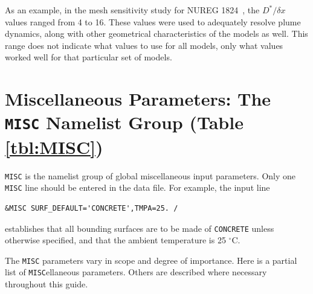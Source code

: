 \documentclass[11pt]{book}
\newcommand{\ct}{\tt\small}
\newcommand{\dx}{\delta x}
\begin{document}
As an example, in the mesh sensitivity study for NUREG 1824~\cite{NUREG_1824}, the $D^*/\dx$ values ranged from 4 to 16.
These values were used to adequately resolve plume dynamics,
along with other geometrical characteristics of the models as well.
This range does not indicate what values to use for all models,
only what values worked well for that particular set of models.


\clearpage
\section{Miscellaneous Parameters: The \texorpdfstring{{\tt MISC}}{MISC} Namelist Group (Table \ref{tbl:MISC})}
\label{info:MISC}

{\ct MISC} is the namelist group of global miscellaneous input parameters.
Only one {\ct MISC} line should be entered in the data file. For example, the input line

\footnotesize
\begin{verbatim}
&MISC SURF_DEFAULT='CONCRETE',TMPA=25. /
\end{verbatim}
\normalsize

\noindent
establishes that all bounding surfaces are to be made of {\ct CONCRETE} unless
otherwise specified, and that
the ambient temperature is 25 $^\circ$C.

The {\ct MISC} parameters vary in scope and degree of importance. Here is a partial list of {\ct MISC}ellaneous parameters. Others are described where necessary throughout this
guide.
\end{document}
